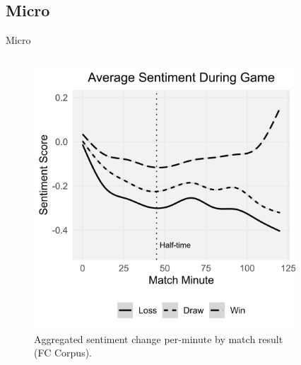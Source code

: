 \documentclass[10pt]{beamer}
\begin{document}
\subsection{Micro}
\begin{frame}{Micro}
\begin{columns}
\begin{column}{0.5\textwidth}
\begin{figure}
    \includegraphics[width=\columnwidth]{sentiment_during_match_small_600dpi.jpg}
    \caption{Aggregated sentiment change per-minute by match result (FC Corpus).}
    \label{fig:sentimentchange}
\end{figure}
\end{column}
\begin{column}{0.5\textwidth}
\begin{figure}

\end{figure}
\end{column}
\end{columns}
\end{frame}
\end{document}
